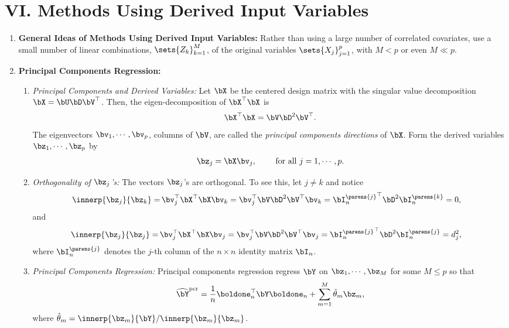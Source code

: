 \documentclass[12pt]{article}
\begin{document}
\section*{VI. Methods Using Derived Input Variables}

\begin{enumerate}[label=\textbf{\arabic*.}]

	\item \textbf{General Ideas of Methods Using Derived Input Variables:} Rather than using a large number of correlated covariates, use a small number of linear combinations, $\sets{Z_k}_{k=1}^M$, of the original variables $\sets{X_j}_{j=1}^p$, with $M < p$ or even $M \ll p$. 
	
	\item \textbf{Principal Components Regression:} 
	\begin{enumerate}
		\item \textit{Principal Components and Derived Variables:} Let $\bX$ be the centered design matrix with the singular value decomposition $\bX = \bU \bD \bV^\top$. Then, the eigen-decomposition of $\bX^\top \bX$ is 
		\begin{align*}
			\bX^\top \bX = \bV \bD^2 \bV^\top. 
		\end{align*}
		The eigenvectors $\bv_1, \cdots, \bv_p$, columns of $\bV$, are called the \emph{principal components directions} of $\bX$. Form the derived variables $\bz_1, \cdots, \bz_p$ by 
		\begin{align*}
			\bz_j = \bX \bv_j, \qquad \text{ for all } j = 1, \cdots, p. 
		\end{align*}
		
		\item \textit{Orthogonality of $\bz_j$'s:} The vectors $\bz_j$'s are orthogonal. To see this, let $j \neq k$ and notice 
		\begin{align*}
			\innerp{\bz_j}{\bz_k} = & \, \bv_j^\top \bX^\top \bX \bv_k = \bv_j^\top \bV \bD^2 \bV^\top \bv_k = {\bI_n^{\parens{j}}}^\top \bD^2 \bI_n^{\parens{k}} = 0, 
		\end{align*}
		and 
		\begin{align*}
			\innerp{\bz_j}{\bz_j} = & \, \bv_j^\top \bX^\top \bX \bv_j = \bv_j^\top \bV \bD^2 \bV^\top \bv_j = {\bI_n^{\parens{j}}}^\top \bD^2 \bI_n^{\parens{j}} = d_j^2, 
		\end{align*}
		where $\bI_n^{\parens{j}}$ denotes the $j$-th column of the $n \times n$ identity matrix $\bI_n$. 
		
		\item \textit{Principal Components Regression:} Principal components regression regress $\bY$ on $\bz_1, \cdots, \bz_M$ for some $M \le p$ so that 
		\begin{align*}
			\widehat{\bY}^{\mathrm{pcr}} = \frac{1}{n} \boldone_n^\top \bY \boldone_n + \sum_{m=1}^M \hat{\theta}_m \bz_m, 
		\end{align*} 
		where $\hat{\theta}_m = \innerp{\bz_m}{\bY} / \innerp{\bz_m}{\bz_m}$. 
		

\end{enumerate}
\end{enumerate}
\end{document}
